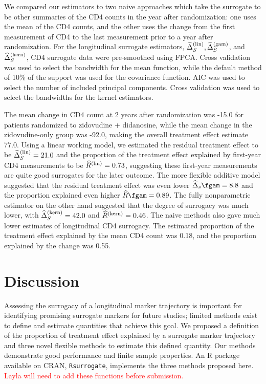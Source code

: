 \documentclass[useAMS,usenatbib,referee]{biom}
\begin{document}
We compared our estimators to two naive approaches which take the surrogate to be other summaries of the CD4 counts in the year after randomization: one uses the mean of the CD4 counts, and the other uses the change from the first measurement of CD4 to the last measurement prior to a year after randomization. For the longitudinal surrogate estimators, ${\widehat\Delta}_S^{(\text{lin})}, {\widehat\Delta}_S^{(\text{gam})}$, and ${\widehat\Delta}_S^{(\text{kern})}$, CD4 surrogate data were pre-smoothed using FPCA. Cross validation was used to select the bandwidth for the mean function, while the default method of 10\% of the support was used for the covariance function. AIC was used to select the number of included principal components. Cross validation was used to select the bandwidths for the kernel estimators. 

The mean change in CD4 count at 2 years after randomization was -15.0 for patients randomized to zidovudine + didanosine, while the mean change in the zidovudine-only group was -92.0, making the overall treatment effect estimate 77.0. Using a linear working model, we estimated the residual treatment effect to be ${\widehat\Delta}_S^{(\text{lin})} = 21.0$ and the proportion of the treatment effect explained by first-year CD4 measurements to be ${\widehat R}^{(\text{lin})} = 0.73$, suggesting these first-year measurements are quite good surrogates for the later outcome. The more flexible additive model suggested that the residual treatment effect was even lower $\Deltahat_s\fgam = 8.8$ and the proportion explained even higher $\Rhat\fgam = 0.89$. The fully nonparametric estimator on the other hand suggested that the degree of surrogacy was much lower, with ${\widehat\Delta}_S^{(\text{kern})} = 42.0$ and ${\widehat R}^{(\text{kern})} = 0.46$. The naive methods also gave much lower estimates of longitudinal CD4 surrogacy. The estimated proportion of the treatment effect explained by the mean CD4 count was 0.18, and the proportion explained by the change was 0.55. 



\section{Discussion}\label{discussion}
Assessing the surrogacy of a longitudinal marker trajectory is important for identifying promising surrogate markers for future studies; limited methods exist to define and estimate quantities that achieve this goal. We proposed a definition of the proportion of treatment effect explained by a surrogate marker trajectory and three novel flexible methods to estimate this defined quantity. Our methods demonstrate good performance and finite sample properties. An R package available on CRAN, \texttt{Rsurrogate}, implements the three methods proposed here. \textcolor{red}{Layla will need to add these functions before submission.}
\end{document}
